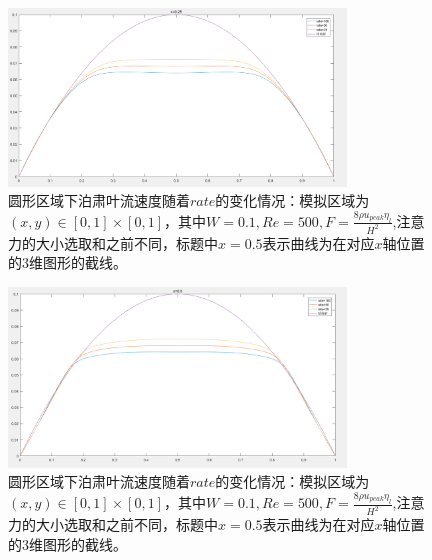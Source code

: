 \documentclass[11pt,UTF8]{ctexart}
\begin{document}
    \begin{figure}[h]
        \centerline{\includegraphics[width=0.8\textwidth]{Circula_F_rate_x=0_25.PNG}}
        \caption{圆形区域下泊肃叶流速度随着$rate$的变化情况：模拟区域为$(x,y)\in [0,1]\times [0,1]$，其中$W=0.1,Re=500,F=\frac{8\rho u_{peak} \eta_l}{H^2}$,注意力的大小选取和之前不同，标题中$x=0.5$表示曲线为在对应$x$轴位置的3维图形的截线。}
        \label{img23}
    \end{figure}
    \begin{figure}[h]
        \centerline{\includegraphics[width=0.8\textwidth]{Circula_F_rate_x=0_5.PNG}}
        \caption{圆形区域下泊肃叶流速度随着$rate$的变化情况：模拟区域为$(x,y)\in [0,1]\times [0,1]$，其中$W=0.1,Re=500,F=\frac{8\rho u_{peak} \eta_l}{H^2}$,注意力的大小选取和之前不同，标题中$x=0.5$表示曲线为在对应$x$轴位置的3维图形的截线。}
        \label{img24}
    \end{figure}
\end{document}
